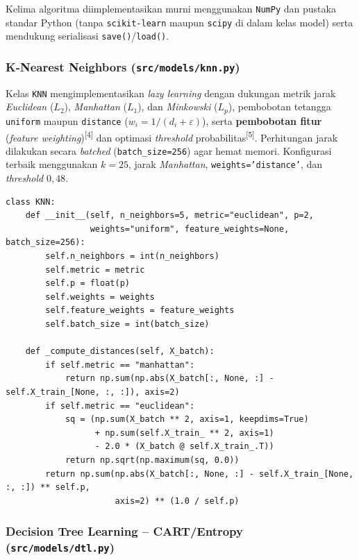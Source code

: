 \documentclass[11pt,a4paper]{article}
\numberwithin{figure}{section}
\numberwithin{table}{section}
\newcommand{\fnmark}[1]{\textsuperscript{[#1]}}
\begin{document}
Kelima algoritma diimplementasikan murni menggunakan \texttt{NumPy} dan pustaka standar Python (tanpa \texttt{scikit-learn} maupun \texttt{scipy} di dalam kelas model) serta mendukung serialisasi \texttt{save()}/\texttt{load()}.

\subsubsection[K-Nearest Neighbors]{K-Nearest Neighbors (\texttt{src/models/knn.py})}

Kelas \texttt{KNN} mengimplementasikan \textit{lazy learning} dengan dukungan metrik jarak \textit{Euclidean} ($L_2$), \textit{Manhattan} ($L_1$), dan \textit{Minkowski} ($L_p$), pembobotan tetangga \texttt{uniform} maupun \texttt{distance} ($w_i = 1/(d_i + \varepsilon)$), serta \textbf{pembobotan fitur} (\textit{feature weighting})\fnmark{4} dan optimasi \textit{threshold} probabilitas\fnmark{5}. Perhitungan jarak dilakukan secara \textit{batched} (\texttt{batch\_size=256}) agar hemat memori. Konfigurasi terbaik menggunakan $k=25$, jarak \textit{Manhattan}, \texttt{weights='distance'}, dan \textit{threshold} $0{,}48$.

\noindent\begin{minipage}{\linewidth}
\begin{lstlisting}
class KNN:
    def __init__(self, n_neighbors=5, metric="euclidean", p=2,
                 weights="uniform", feature_weights=None, batch_size=256):
        self.n_neighbors = int(n_neighbors)
        self.metric = metric
        self.p = float(p)
        self.weights = weights
        self.feature_weights = feature_weights
        self.batch_size = int(batch_size)

    def _compute_distances(self, X_batch):
        if self.metric == "manhattan":
            return np.sum(np.abs(X_batch[:, None, :] - self.X_train_[None, :, :]), axis=2)
        if self.metric == "euclidean":
            sq = (np.sum(X_batch ** 2, axis=1, keepdims=True)
                  + np.sum(self.X_train_ ** 2, axis=1)
                  - 2.0 * (X_batch @ self.X_train_.T))
            return np.sqrt(np.maximum(sq, 0.0))
        return np.sum(np.abs(X_batch[:, None, :] - self.X_train_[None, :, :]) ** self.p,
                      axis=2) ** (1.0 / self.p)
\end{lstlisting}
\end{minipage}

\subsubsection[Decision Tree Learning -- CART/Entropy]{Decision Tree Learning -- CART/Entropy (\texttt{src/models/dtl.py})}
\end{document}
